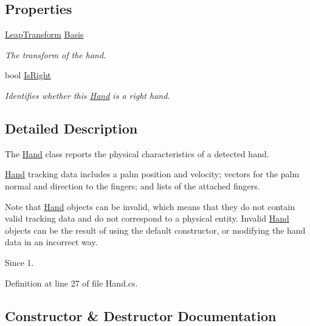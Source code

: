 \subsection*{Properties}
\begin{DoxyCompactItemize}
\item 
\mbox{\hyperlink{struct_leap_1_1_leap_transform}{Leap\+Transform}} \mbox{\hyperlink{class_leap_1_1_hand_a31cd466c474963af5727269c7c9d6b5a}{Basis}}
\begin{DoxyCompactList}\small\item\em The transform of the hand. \end{DoxyCompactList}\item 
bool \mbox{\hyperlink{class_leap_1_1_hand_afa3c502b072d3101b7366fd928376e18}{Is\+Right}}
\begin{DoxyCompactList}\small\item\em Identifies whether this \mbox{\hyperlink{class_leap_1_1_hand}{Hand}} is a right hand. \end{DoxyCompactList}\end{DoxyCompactItemize}


\subsection{Detailed Description}
The \mbox{\hyperlink{class_leap_1_1_hand}{Hand}} class reports the physical characteristics of a detected hand. 

\mbox{\hyperlink{class_leap_1_1_hand}{Hand}} tracking data includes a palm position and velocity; vectors for the palm normal and direction to the fingers; and lists of the attached fingers.

Note that \mbox{\hyperlink{class_leap_1_1_hand}{Hand}} objects can be invalid, which means that they do not contain valid tracking data and do not correspond to a physical entity. Invalid \mbox{\hyperlink{class_leap_1_1_hand}{Hand}} objects can be the result of using the default constructor, or modifying the hand data in an incorrect way. \begin{DoxySince}{Since}
1. 
\end{DoxySince}


Definition at line 27 of file Hand.\+cs.



\subsection{Constructor \& Destructor Documentation}
\mbox{\label{class_leap_1_1_hand_a80199f766e3002861153afefa3d19650}} 

